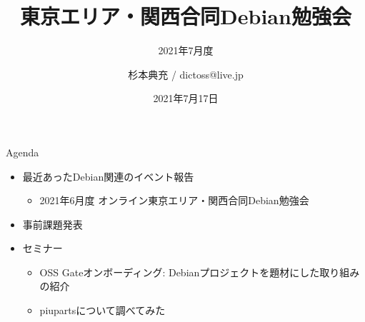\title{東京エリア・関西合同Debian勉強会}
\subtitle{2021年7月度} %
\author{杉本典充 / dictoss@live.jp}
\date{2021年7月17日}



\begin{frame}
\titlepage{}
\end{frame}

\begin{frame}{Agenda}
 \begin{minipage}[t]{0.45\hsize}
  \begin{itemize}
  \item 最近あったDebian関連のイベント報告
    \begin{itemize}
    \item 2021年6月度 オンライン東京エリア・関西合同Debian勉強会
    \end{itemize}
  \item 事前課題発表
  \end{itemize}
 \end{minipage}
 \begin{minipage}[t]{0.45\hsize}
   \begin{itemize}
   \item セミナー
     \begin{itemize}
      \item OSS Gateオンボーディング: Debianプロジェクトを題材にした取り組みの紹介
      \item piupartsについて調べてみた
     \end{itemize}
  \end{itemize}
 \end{minipage}
\end{frame}

